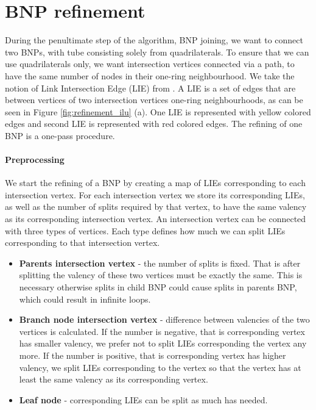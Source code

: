 \section{BNP refinement}\label{sec:bnp_sub}
During the penultimate step of the algorithm, BNP joining, we want to connect two BNPs, with tube consisting solely from quadrilaterals. To ensure that we can use quadrilaterals only, we want intersection vertices connected via a path, to have the same number of nodes in their one-ring neighbourhood. We take the notion of Link Intersection Edge (LIE) from \cite{sqm}. A LIE is a set of edges that are between vertices of two intersection vertices one-ring neighbourhoods, as can be seen in Figure \ref{fig:refinement_ilu} (a). One LIE is represented with yellow colored edges and second LIE is represented with red colored edges. The refining of one BNP is a one-pass procedure.

\paragraph{Preprocessing}
We start the refining of a BNP by creating a map of LIEs corresponding to each intersection vertex. For each intersection vertex we store its corresponding LIEs, as well as the number of splits required by that vertex, to have the same valency as its corresponding intersection vertex. An intersection vertex can be connected with three types of vertices. Each type defines how much we can split LIEs corresponding to that intersection vertex.
\begin{itemize}
	\itemsep-0.25em 
	\item \textbf{Parents intersection vertex} - the number of splits is fixed. That is after splitting the valency of these two vertices must be exactly the same. This is necessary otherwise splits in child BNP could cause splits in parents BNP, which could result in infinite loops.
	\item \textbf{Branch node intersection vertex} - difference between valencies of the two vertices is calculated. If the number is negative, that is corresponding vertex has smaller valency, we prefer not to split LIEs corresponding the vertex any more. If the number is positive, that is corresponding vertex has higher valency, we split LIEs corresponding to the vertex so that the vertex has at least the same valency as its corresponding vertex.
	\item \textbf{Leaf node} - corresponding LIEs can be split as much has needed.
\end{itemize}

